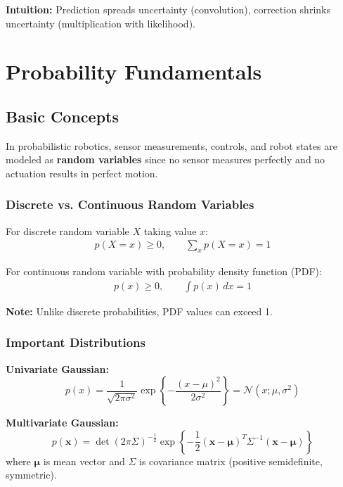\vspace{3mm}
\textbf{Intuition:} Prediction spreads uncertainty (convolution), correction shrinks uncertainty (multiplication with likelihood).

\section{Probability Fundamentals}

\subsection{Basic Concepts}

In probabilistic robotics, sensor measurements, controls, and robot states are modeled as \textbf{random variables} since no sensor measures perfectly and no actuation results in perfect motion.

\subsubsection{Discrete vs. Continuous Random Variables}

For discrete random variable $X$ taking value $x$:
\begin{align}
  p(X=x) \geq 0, \qquad \sum_{x}{p(X=x)} = 1
\end{align}

For continuous random variable with probability density function (PDF):
\begin{align}
  p(x) \geq 0, \qquad \int{p(x)\,dx} = 1
\end{align}

\textbf{Note:} Unlike discrete probabilities, PDF values can exceed 1.

\subsubsection{Important Distributions}

\textbf{Univariate Gaussian:}
\begin{equation}
    p(x) = \frac{1}{\sqrt{2\pi\sigma^2}} \exp\left\{-\frac{(x-\mu)^2}{2\sigma^2}\right\} = \mathcal{N}(x; \mu, \sigma^2)
\end{equation}

\textbf{Multivariate Gaussian:}
\begin{equation}
  p(\mathbf{x}) = \det(2\pi\Sigma)^{-\frac{1}{2}} \exp\left\{-\frac{1}{2}(\mathbf{x}-\boldsymbol{\mu})^{T}\Sigma^{-1}(\mathbf{x}-\boldsymbol{\mu})\right\}
  \label{eq:multivariate_normal}
\end{equation}
where $\boldsymbol{\mu}$ is mean vector and $\Sigma$ is covariance matrix (positive semidefinite, symmetric).

